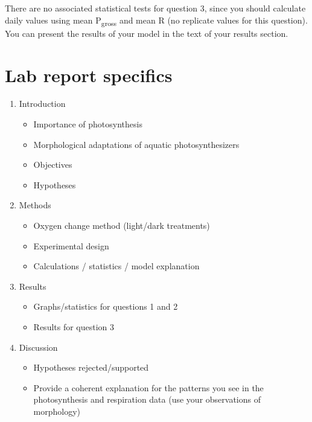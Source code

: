 \documentclass[]{krantz}
\providecommand{\tightlist}{%
  \setlength{\itemsep}{0pt}\setlength{\parskip}{0pt}}
\theoremstyle{definition}
\theoremstyle{definition}
\theoremstyle{definition}
\theoremstyle{remark}
\begin{document}
There are no associated statistical tests for question 3, since you
should calculate daily values using mean P\textsubscript{gross} and mean
R (no replicate values for this question). You can present the results
of your model in the text of your results section.

\pagebreak

\section{Lab report specifics}\label{lab-report-specifics-1}

\begin{enumerate}
\def\labelenumi{\arabic{enumi}.}
\tightlist
\item
  Introduction

  \begin{itemize}
  \tightlist
  \item
    Importance of photosynthesis
  \item
    Morphological adaptations of aquatic photosynthesizers
  \item
    Objectives
  \item
    Hypotheses
  \end{itemize}
\item
  Methods

  \begin{itemize}
  \tightlist
  \item
    Oxygen change method (light/dark treatments)
  \item
    Experimental design
  \item
    Calculations / statistics / model explanation
  \end{itemize}
\item
  Results

  \begin{itemize}
  \tightlist
  \item
    Graphs/statistics for questions 1 and 2
  \item
    Results for question 3
  \end{itemize}
\item
  Discussion

  \begin{itemize}
  \tightlist
  \item
    Hypotheses rejected/supported
  \item
    Provide a coherent explanation for the patterns you see in the
    photosynthesis and respiration data (use your observations of
    morphology)
  \end{itemize}
\end{enumerate}
\end{document}
